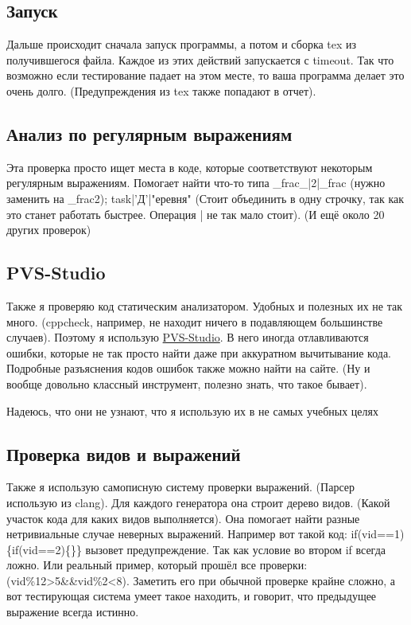 \documentclass[a4paper,12pt,DIV15]{article}
\theoremstyle{definition}
\theoremstyle{plain}
\theoremstyle{remark}
\begin{document}
\subsection{Запуск}
Дальше происходит сначала запуск программы, а потом и сборка tex из получившегося файла. Каждое из этих действий запускается с timeout. Так что возможно если тестирование падает на этом месте, то ваша программа делает 
это очень долго. (Предупреждения из tex также попадают в отчет).
\subsection{Анализ по регулярным выражениям}
Эта проверка просто ищет места в коде, которые соответствуют некоторым регулярным выражениям.
Помогает найти что-то типа \_frac\_|2|\_frac (нужно заменить на \_frac2); task|'Д'|"еревня" (Стоит объединить в одну строчку, так как это станет работать быстрее. Операция | не так мало стоит). (И ещё около 20 других проверок)
\subsection{PVS-Studio}
Также я проверяю код статическим анализатором. Удобных и полезных их не так много. (cppcheck, например, не находит ничего в подавляющем большинстве случаев). Поэтому я использую \href{http://viva64.com}{PVS-Studio}. В него иногда отлавливаются ошибки, 
которые не так просто найти даже при аккуратном вычитывание кода. Подробные разъяснения кодов ошибок также можно найти на сайте. (Ну и вообще довольно классный инструмент, полезно знать, что такое бывает). 
\par Надеюсь, что они не узнают, что я использую их в не самых учебных целях
\subsection{Проверка видов и выражений}
Также я использую самописную систему проверки выражений. (Парсер использую из clang). Для каждого генератора она строит дерево видов. (Какой участок кода для каких видов выполняется). Она помогает найти разные нетривиальные 
случае неверных выражений. Например вот такой код: if(vid==1)\{if(vid==2)\{\}\} вызовет предупреждение. Так как условие во втором if всегда ложно. Или реальный пример, который прошёл все проверки: 
(vid\%12>5\&\&vid\%2<8). Заметить его при обычной проверке крайне сложно, а вот тестирующая система умеет такое находить, и говорит, что предыдущее выражение всегда истинно.
\end{document}
